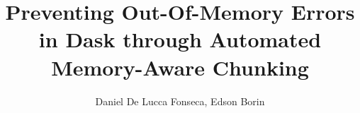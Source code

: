 \documentclass[12pt]{article}
\title{Preventing Out-Of-Memory Errors in Dask through Automated Memory-Aware Chunking}
\author{Daniel De Lucca Fonseca\inst{1}, Edson Borin\inst{1}}
\begin{document}
\maketitle

\begin{abstract}

\end{abstract}









\end{document}
